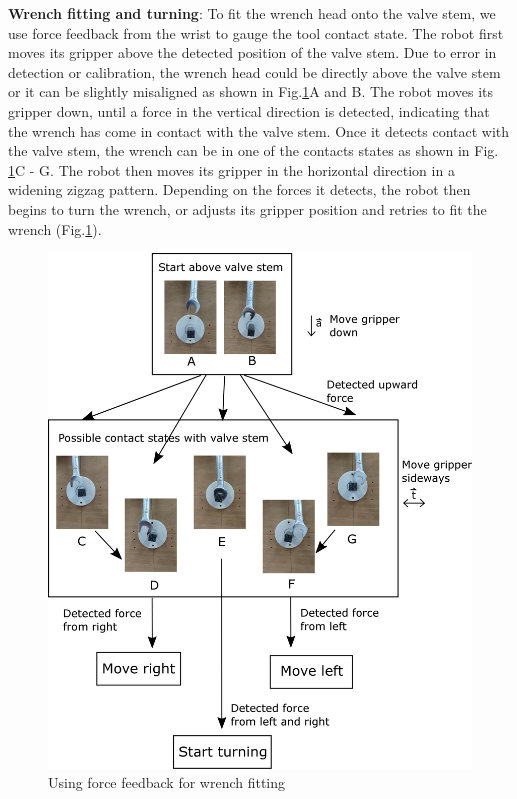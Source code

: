 \documentclass{standalone}
\begin{document}
\textbf{Wrench fitting and turning}: To fit the wrench head onto the valve stem, we use force feedback from the wrist to gauge the tool contact state. The robot first moves its gripper above the detected position of the valve stem. Due to error in detection or calibration, the wrench head could be directly above the valve stem or it can be slightly misaligned as shown in Fig.\ref{fig:figure4}A and B. The robot moves its gripper down, until a force in the vertical direction is detected, indicating that the wrench has come in contact with the valve stem. Once it detects contact with the valve stem, the wrench can be in one of the contacts states as shown in Fig. \ref{fig:figure4}C - G. The robot then moves its gripper in the horizontal direction in a widening zigzag pattern. Depending on the forces it detects, the robot then begins to turn the wrench, or adjusts its gripper position and retries to fit the wrench (Fig.\ref{fig:figure4}).


\begin{figure}
  \includegraphics[width=\columnwidth]{sections/task2/images/figure4}
  \caption{Using force feedback for wrench fitting}
  \label{fig:figure4}
\end{figure}
\end{document}
